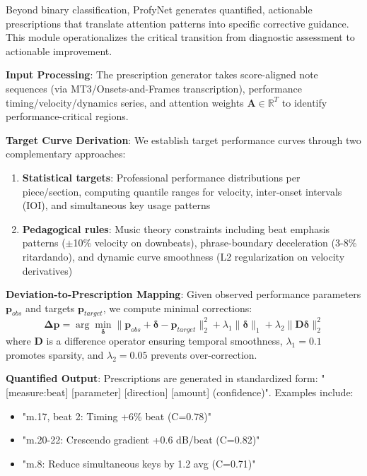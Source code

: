 \documentclass[sigconf,review,anonymous]{acmart}
\begin{document}
Beyond binary classification, ProfyNet generates quantified, actionable prescriptions that translate attention patterns into specific corrective guidance. This module operationalizes the critical transition from diagnostic assessment to actionable improvement.

\textbf{Input Processing}: The prescription generator takes score-aligned note sequences (via MT3/Onsets-and-Frames transcription), performance timing/velocity/dynamics series, and attention weights $\mathbf{A} \in \mathbb{R}^{T}$ to identify performance-critical regions.

\textbf{Target Curve Derivation}: We establish target performance curves through two complementary approaches:
\begin{enumerate}
\item \textbf{Statistical targets}: Professional performance distributions per piece/section, computing quantile ranges for velocity, inter-onset intervals (IOI), and simultaneous key usage patterns
\item \textbf{Pedagogical rules}: Music theory constraints including beat emphasis patterns ($\pm$10\% velocity on downbeats), phrase-boundary deceleration (3-8\% ritardando), and dynamic curve smoothness (L2 regularization on velocity derivatives)
\end{enumerate}

\textbf{Deviation-to-Prescription Mapping}: Given observed performance parameters $\mathbf{p}_{obs}$ and targets $\mathbf{p}_{target}$, we compute minimal corrections:
\begin{equation}
\mathbf{\Delta p} = \arg\min_{\mathbf{\delta}} \|\mathbf{p}_{obs} + \mathbf{\delta} - \mathbf{p}_{target}\|_2^2 + \lambda_1 \|\mathbf{\delta}\|_1 + \lambda_2 \|\mathbf{D\delta}\|_2^2
\end{equation}
where $\mathbf{D}$ is a difference operator ensuring temporal smoothness, $\lambda_1=0.1$ promotes sparsity, and $\lambda_2=0.05$ prevents over-correction.

\textbf{Quantified Output}: Prescriptions are generated in standardized form: "[measure:beat] [parameter] [direction] [amount] (confidence)". Examples include:
\begin{itemize}
\item "m.17, beat 2: Timing +6\% beat (C=0.78)"
\item "m.20-22: Crescendo gradient +0.6 dB/beat (C=0.82)"
\item "m.8: Reduce simultaneous keys by 1.2 avg (C=0.71)"
\end{itemize}
\end{document}
